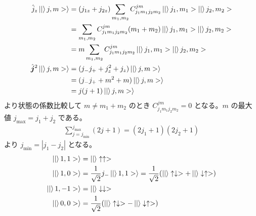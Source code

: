\documentclass[uplatex,dvipdfmx,a4paper,11pt]{jlreq}
\numberwithin{equation}{section}
\theoremstyle{definition}
\begin{document}
\begin{align}
  \hat{j}_z\ket|j, m>\rangle      & = (j_{1z} + j_{2z})\sum_{m_1, m_2}C_{j_1m_1j_2m_2}^{jm}\ket|j_1, m_1>\ket|j_2, m_2> \\
                                  & = \sum_{m_1, m_2}C_{j_1m_1j_2m_2}^{jm}(m_1 + m_2)\ket|j_1, m_1>\ket|j_2, m_2>       \\
                                  & = m\sum_{m_1, m_2}C_{j_1m_1j_2m_2}^{jm}\ket|j_1, m_1>\ket|j_2, m_2>                 \\
  \hat{\bm{j}}^2\ket|j, m>\rangle & = (j_-j_+ + j_z^2 + j_z)\ket|j, m>\rangle                                           \\
                                  & = (j_-j_+ + m^2 + m)\ket|j, m>\rangle                                               \\
                                  & = j(j + 1)\ket|j, m>\rangle
\end{align}
より状態の係数比較して $m \neq m_1 + m_2$ のとき $C_{j_1m_1j_2m_2}^{jm} = 0$ となる。$m$ の最大値 $j_{\max} = j_1 + j_2$ である。
\begin{align}
  \sum_{j=j_{\min}}^{j_{\max}} (2j + 1) = (2j_1 + 1)(2j_2 + 1)
\end{align}
より $j_{\min} = |j_1 - j_2|$ となる。
\begin{align}
  \ket|1, 1>\rangle  & = \ket|\uparrow\uparrow>                                                                                               \\
  \ket|1, 0>\rangle  & = \frac{1}{\sqrt{2}}j_-\ket|1, 1>\rangle = \frac{1}{\sqrt{2}}\qty(\ket|\uparrow\downarrow> + \ket|\downarrow\uparrow>) \\
  \ket|1, -1>\rangle & = \ket|\downarrow\downarrow>                                                                                           \\
  \ket|0, 0>\rangle  & = \frac{1}{\sqrt{2}}\qty(\ket|\uparrow\downarrow> - \ket|\downarrow\uparrow>)
\end{align}
\end{document}
